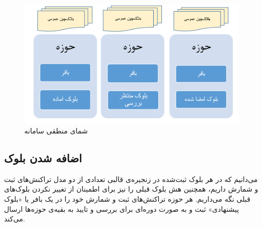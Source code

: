 \begin{figure}[th]
	\centering
	\includegraphics[width=1\linewidth]{blockchain.PNG}
	\caption {شمای منطقی سامانه}
	\label{fig:bigpic}
\end{figure}

\subsection{اضافه شدن بلوک}
می‌دانیم که در هر بلوک ثبت‌شده در زنجیره‌ی قالبی تعدادی از دو مدل تراکنش‌های ثبت و شمارش داریم، همچنین هش بلوک قبلی را نیز برای اطمینان از تغییر نکردن بلوک‌های قبلی نگه ‌می‌داریم. هر حوزه تراکنش‌های ثبت و شمارش خود را در یک بافر
یا «بلوک پیشنهادی» ثبت و به صورت دوره‌ای برای بررسی و تایید به بقیه‌ی حوزه‌ها ارسال می‌کند. 

